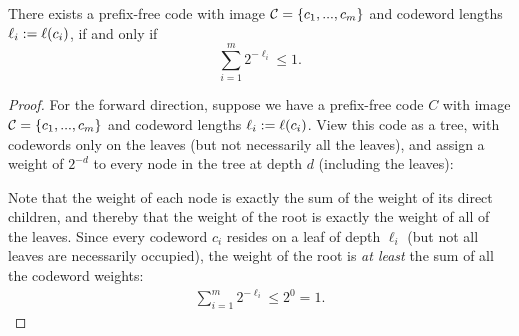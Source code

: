 \begin{theorem}
There exists a prefix-free code with image ${\cal C} = \{c_1, ..., c_m\}$ and codeword lengths $\ell_i := \ell(c_i)$, if and only if
\[
\sum_{i=1}^m 2^{-\ell_i} \leq 1.
\]
\end{theorem}
\begin{proof}
For the forward direction, suppose we have a prefix-free code $C$ with image ${\cal C} = \{c_1, ..., c_m\}$ and codeword lengths $\ell_i := \ell(c_i)$. View this code as a tree, with codewords only on the leaves (but not necessarily all the leaves), and assign a weight of $2^{-d}$ to every node in the tree at depth $d$ (including the leaves):
\begin{center}
\end{center}

\noindent Note that the weight of each node is exactly the sum of the weight of its direct children, and thereby that the weight of the root is exactly the weight of all of the leaves. Since every codeword $c_i$ resides on a leaf of depth $\ell_i$ (but not all leaves are necessarily occupied), the weight of the root is \emph{at least} the sum of all the codeword weights:
\begin{align}
\sum_{i=1}^{m} 2^{-\ell_i} \leq 2^0 = 1.
\end{align}


\end{proof}
